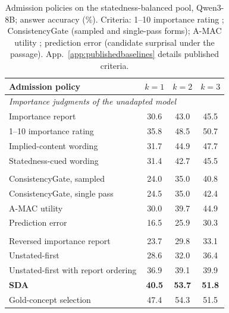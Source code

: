 \begin{table}[!htbp]
\centering
\caption{Admission policies on the statedness-balanced pool, Qwen3-8B; answer accuracy (\%). Criteria: 1--10 importance rating \citep{park2023generative}; ConsistencyGate \citep{consistencygate2026} (sampled and single-pass forms); A-MAC utility \citep{amac2026}; prediction error \citep{nemori2026} (candidate surprisal under the passage). App.~\ref{app:publishedbaselines} details published criteria.}
\label{tab:balancedbaselines}
\small
\setlength{\tabcolsep}{3pt}
\begin{tabular}{lccc}
\toprule
Admission policy & $k=1$ & $k=2$ & $k=3$ \\
\midrule
\multicolumn{4}{l}{\emph{Importance judgments of the unadapted model}} \\
Importance report & 30.6 & 43.0 & 45.5 \\
1--10 importance rating & 35.8 & 48.5 & 50.7 \\
Implied-content wording & 31.7 & 44.9 & 47.7 \\
Statedness-cued wording & 31.4 & 42.7 & 45.5 \\
\addlinespace
\multicolumn{4}{l}{\emph{Admission criteria from published methods}} \\
ConsistencyGate, sampled & 24.0 & 35.0 & 40.8 \\
ConsistencyGate, single pass & 24.5 & 35.0 & 42.4 \\
A-MAC utility & 30.0 & 39.7 & 44.9 \\
Prediction error & 16.5 & 25.9 & 30.3 \\
\addlinespace
\multicolumn{4}{l}{\emph{Statedness rules}} \\
Reversed importance report & 23.7 & 29.8 & 33.1 \\
Unstated-first & 28.6 & 32.0 & 36.4 \\
Unstated-first with report ordering & 36.9 & 39.1 & 39.9 \\
\midrule
\textbf{SDA} & \textbf{40.5} & \textbf{53.7} & \textbf{51.8} \\
\addlinespace
{} Gold-concept selection & 47.4 & 54.3 & 51.5 \\
\bottomrule
\end{tabular}
\end{table}
